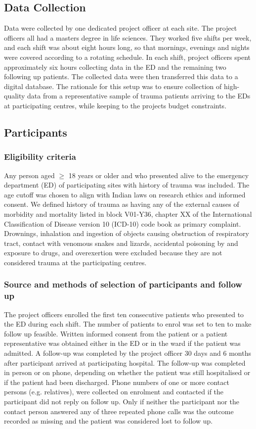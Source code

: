 \documentclass[10pt,letterpaper]{article}\usepackage[]{graphicx}\usepackage[]{color}
\begin{document}
\subsection*{Data Collection}
Data were collected by one dedicated project officer at each site. The project
officers all had a masters degree in life sciences. They worked five shifts per
week, and each shift was about eight hours long, so that mornings, evenings and
nights were covered according to a rotating schedule. In each shift, project
officers spent approximately six hours collecting data in the ED and the
remaining two following up patients. The collected data were then transferred
this data to a digital database. The rationale for this setup was to ensure
collection of high-quality data from a representative sample of trauma patients
arriving to the EDs at participating centres, while keeping to the projects
budget constraints.

\subsection*{Participants}
\subsubsection*{Eligibility criteria}
Any person aged $\geq$ 18 years or older and who presented alive to the
emergency department (ED) of participating sites with history of trauma was
included. The age cutoff was chosen to align with Indian laws on research ethics
and informed consent. We defined history of trauma as having any of the external
causes of morbidity and mortality listed in block V01-Y36, chapter XX of the
International Classification of Disease version 10 (ICD-10) code book as primary
complaint. Drownings, inhalation and ingestion of objects causing obstruction of
respiratory tract, contact with venomous snakes and lizards, accidental
poisoning by and exposure to drugs, and overexertion were excluded because they
are not considered trauma at the participating centres.

\subsubsection*{Source and methods of selection of participants and follow up}
The project officers enrolled the first ten consecutive patients who presented
to the ED during each shift. The number of patients to enrol was set to ten to
make follow up feasible. Written informed consent from the patient or a patient
representative was obtained either in the ED or in the ward if the patient was
admitted. A follow-up was completed by the project officer 30 days and 6 months
after participant arrived at participating hospital. The follow-up was completed
in person or on phone, depending on whether the patient was still hospitalised
or if the patient had been discharged. Phone numbers of one or more contact
persons (e.g. relatives), were collected on enrolment and contacted if the
participant did not reply on follow up. Only if neither the participant nor the
contact person answered any of three repeated phone calls was the outcome
recorded as missing and the patient was considered lost to follow up.
\end{document}
